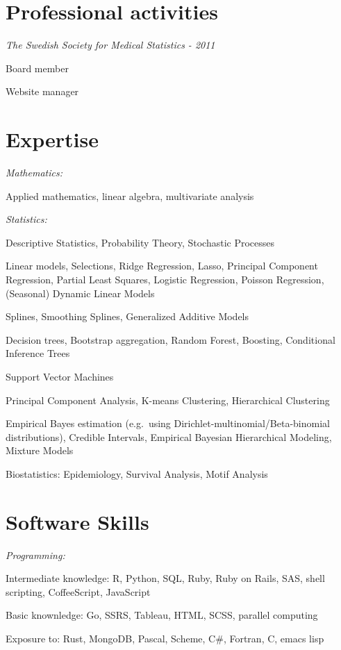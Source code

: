 \section{Professional activities}
\textit{The Swedish Society for Medical Statistics - 2011}
\begin{innerlist}
\item{Board member}
\item{Website manager}
\end{innerlist}

%
%
\section{Expertise}
\textit{Mathematics:}
\begin{innerlist}
\item Applied mathematics, linear algebra, multivariate analysis
\end{innerlist}

\halfblankline

\textit{Statistics:}
\begin{innerlist}
\item Descriptive Statistics, Probability Theory, Stochastic Processes
\item Linear models, Selections, Ridge Regression, Lasso, Principal Component Regression, Partial Least Squares, Logistic Regression, Poisson Regression, (Seasonal) Dynamic Linear Models
\item Splines, Smoothing Splines, Generalized Additive Models
\item Decision trees, Bootstrap aggregation, Random Forest, Boosting, Conditional Inference Trees
\item Support Vector Machines
\item Principal Component Analysis, K-means Clustering, Hierarchical Clustering
\item Empirical Bayes estimation (e.g.\ using Dirichlet-multinomial/Beta-binomial distributions), Credible Intervals, Empirical Bayesian Hierarchical Modeling, Mixture Models
\item Biostatistics: Epidemiology, Survival Analysis, Motif Analysis
\end{innerlist}

%
%
\section{Software Skills}
\textit{Programming:}
\begin{innerlist}
\item Intermediate knowledge: R, Python, SQL, Ruby, Ruby on Rails, SAS, shell scripting, CoffeeScript, JavaScript
\item Basic knownledge: Go, SSRS, Tableau, HTML, SCSS, parallel computing
\item Exposure to: Rust, MongoDB, Pascal, Scheme, C\#, Fortran, C, emacs lisp
\end{innerlist}

